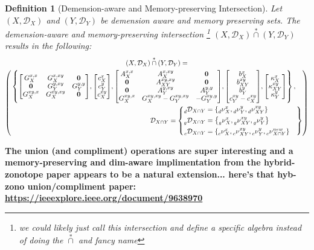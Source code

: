 \documentclass[11pt]{article}
\newtheorem{definition}{Definition}
\newcommand{\Key}{\nu} %
\newcommand{\Dict}{\mathcal{D}} %
\newcommand{\dimKey}{\prescript{}{d}{\Key}} %
\newcommand{\dimDict}{\prescript{}{d}{\Dict}} %
\newcommand{\factorKey}{\prescript{}{g}{\Key}} %
\newcommand{\factorDict}{\prescript{}{g}{\Dict}} %
\newcommand{\conKey}{\prescript{}{c}{\Key}} %
\newcommand{\conDict}{\prescript{}{c}{\Dict}} %
\newcommand{\starCap}{\overset{*}{\cap}} %
\newcommand{\dSet}{\kappa} %
\begin{document}
\begin{definition}[Demension-aware and Memory-preserving Intersection]
	Let $(X,\Dict_{X})$ and $(Y,\Dict_{Y})$ be demension aware and memory preserving sets.
	The demension-aware and memory-preserving intersection \footnote{we could likely just call this intersection and define a specific algebra instead of doing the $\starCap$ and fancy name} $(X,\Dict_{X}) \starCap (Y,\Dict_{Y})$ results in the following:
	\begin{multline}
		(X,\Dict_{X}) \starCap (Y,\Dict_{Y}) = \\
		\left(
			\begin{multlined}
			\left\{
			\begin{multlined}
				\mqty[
				G_{X}^{x,x} & G_{X}^{x,xy} & \vb{0}\\
				\vb{0}		& G_{Y}^{y,xy} & G_{Y}^{y,y}\\
				G_{X}^{xy,x} & G_{X}^{xy,xy} & \vb{0}
			],
			\mqty[
				c_{X}^{x}\\
				c_{Y}^{y}\\
				c_{X}^{xy}
			],%
			\mqty[
				A_{X}^{x,x} 	& A_{X}^{x,xy} & \vb{0}\\
				\vb{0}		& A_{XY}^{xy,xy}	& \vb{0}\\
				\vb{0}		& A_{Y}^{y,xy} & A_{Y}^{y,y}\\
				G_{X}^{xy,x}	& G_{X}^{xy,xy} - G_{Y}^{xy,xy} & -G_{Y}^{xy,y}
			],
			\mqty[
				b_{X}^{x}\\
				b_{XY}^{xy}\\
				b_{Y}^{y}\\
				c_{Y}^{xy} - c_{X}^{xy}
			],
			\mqty[
				\dSet_{X}^{x}\\
				\dSet_{XY}^{xy}\\
				\dSet_{Y}^{y}
			]
			\end{multlined}
		\right\},\\
		\Dict_{X\cap Y} = \left\{
			\begin{aligned}
				\dimDict_{X \cap Y} &= \qty{
				\dimKey_{X}^{x}, \dimKey_{Y}^{y}, \dimKey_{XY}^{xy}
			}\\
			\factorDict_{X \cap Y} &= \qty{
				\factorKey_{X}^{x},\factorKey_{XY}^{xy},\factorKey_{Y}^{y}
			}\\
			\conDict_{X \cap Y} &= \qty{
				\conKey_{X}^{x},\conKey_{XY}^{xy},\conKey_{Y}^{y},\conKey_{X \cap Y}^{new}
			}
			\end{aligned}
		\right\}
		\end{multlined}
		\right)
	\end{multline}
\end{definition}


\textbf{
	The union (and compliment) operations are super interesting and a memory-preserving and dim-aware implimentation from the hybrid-zonotope paper appears to be a natural extension... here's that hyb-zono union/compliment paper:
	\url{https://ieeexplore.ieee.org/document/9638970}
}
\end{document}
